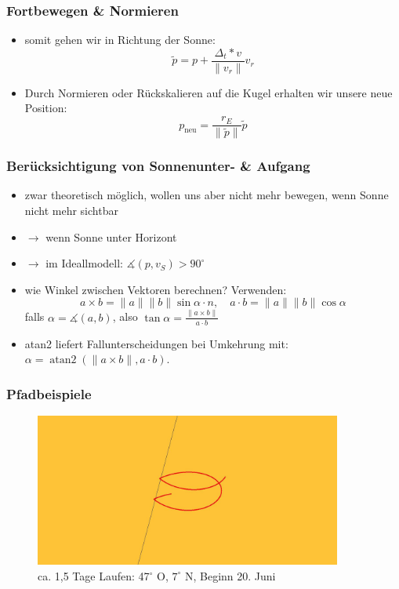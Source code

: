 \documentclass[aspectratio=43]{beamer}
\DeclareMathOperator{\atan}{atan2}
\begin{document}
\begin{frame}
    \frametitle{Fortbewegen \& Normieren}
    \begin{itemize}
        \item somit gehen wir in Richtung der Sonne:
            \begin{equation*}
                \tilde p = p + \frac{\Delta_t*v}{\|v_r\|}v_r
            \end{equation*}
        \item Durch Normieren oder Rückskalieren auf die Kugel erhalten wir unsere neue
            Position:
            \begin{equation*}
                p_{\text{neu}} = \frac{r_E}{\|\tilde p\|}\tilde p
            \end{equation*}
    \end{itemize}
\end{frame}

\begin{frame}
    \frametitle{Berücksichtigung von Sonnenunter- \& Aufgang}
    \begin{itemize}
        \item zwar theoretisch möglich, wollen uns aber nicht mehr bewegen, wenn Sonne
            nicht mehr sichtbar
        \item[]$\rightarrow$ wenn Sonne unter Horizont
        \item[]$\rightarrow$ im Ideallmodell: $\measuredangle(p, v_S) > 90^\circ$
        \item wie Winkel zwischen Vektoren berechnen? Verwenden:
            \begin{equation*}
                a \times b = \|a\| \|b\| \sin\alpha \cdot n,\quad
                a \cdot b = \|a\| \|b\| \cos\alpha
            \end{equation*} falls $\alpha = \measuredangle(a, b)$, also $\tan\alpha =
            \frac{\|a\times b\|}{a\cdot b}$
        \item atan2 liefert Fallunterscheidungen bei Umkehrung mit: $\alpha =
            \atan(\|a\times b\|, a\cdot b)$.
    \end{itemize}
\end{frame}

\begin{frame}
    \frametitle{Pfadbeispiele}
    \begin{figure}[t]
        \centering
        \includegraphics[width=0.9\textwidth]{bilder/d172lon7lat47.jpg}
        \caption{ca. 1,5 Tage Laufen: 47$^\circ$ O, $7^\circ$ N, Beginn 20. Juni}
    \end{figure}
\end{frame}
\end{document}
